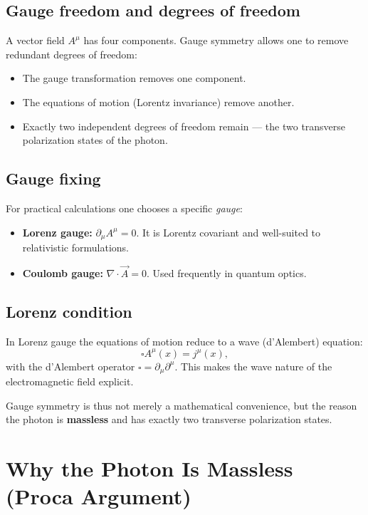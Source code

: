 \subsection*{Gauge freedom and degrees of freedom}
A vector field \( A^\mu \) has four components.  
Gauge symmetry allows one to remove redundant degrees of freedom:
\begin{itemize}
	\item The gauge transformation removes one component.
	\item The equations of motion (Lorentz invariance) remove another.
	\item Exactly two independent degrees of freedom remain — 
	the two transverse polarization states of the photon.
\end{itemize}

\subsection*{Gauge fixing}
For practical calculations one chooses a specific \emph{gauge}:
\begin{itemize}
	\item \textbf{Lorenz gauge:} 
	\(\partial_\mu A^\mu = 0\).  
	It is Lorentz covariant and well-suited to relativistic formulations.
	\item \textbf{Coulomb gauge:} 
	\(\nabla \cdot \vec{A} = 0\).  
	Used frequently in quantum optics.
\end{itemize}

\subsection*{Lorenz condition}
In Lorenz gauge the equations of motion reduce to a wave (d’Alembert) equation:
\[
\square A^\mu(x) = j^\mu(x),
\]
with the d’Alembert operator \(\square = \partial_\mu \partial^\mu\).
This makes the wave nature of the electromagnetic field explicit.

\medskip
Gauge symmetry is thus not merely a mathematical convenience, 
but the reason the photon is \textbf{massless} and has exactly two transverse polarization states.
\newpage
\noindent
\section{Why the Photon Is Massless \newline (Proca Argument)}
\label{anhangA:masselosigkeit_proca}

